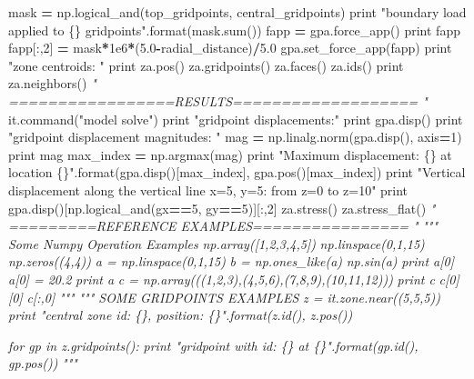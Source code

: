 \documentclass[a4paper, nobind]{templates/ociamthesis}
\newenvironment{Shaded}{\begin{snugshade}}{\end{snugshade}}
\newcommand{\BuiltInTok}[1]{#1}
\newcommand{\CommentTok}[1]{\textcolor[rgb]{0.56,0.35,0.01}{\textit{#1}}}
\newcommand{\DecValTok}[1]{\textcolor[rgb]{0.00,0.00,0.81}{#1}}
\newcommand{\FloatTok}[1]{\textcolor[rgb]{0.00,0.00,0.81}{#1}}
\newcommand{\NormalTok}[1]{#1}
\newcommand{\OperatorTok}[1]{\textcolor[rgb]{0.81,0.36,0.00}{\textbf{#1}}}
\newcommand{\SpecialCharTok}[1]{\textcolor[rgb]{0.00,0.00,0.00}{#1}}
\newcommand{\StringTok}[1]{\textcolor[rgb]{0.31,0.60,0.02}{#1}}
\renewenvironment{Shaded}
{
  \vspace{10pt}%
  \begin{snugshade}%
}{%
  \end{snugshade}%
  \vspace{8pt}%
}
\begin{document}
\begin{Shaded}
\begin{Highlighting}[]
\NormalTok{mask }\OperatorTok{=}\NormalTok{ np.logical\_and(top\_gridpoints, central\_gridpoints)}
\BuiltInTok{print} \StringTok{"boundary load applied to }\SpecialCharTok{\{\}}\StringTok{ gridpoints"}\NormalTok{.}\BuiltInTok{format}\NormalTok{(mask.}\BuiltInTok{sum}\NormalTok{())}
\NormalTok{fapp }\OperatorTok{=}\NormalTok{ gpa.force\_app()}
\BuiltInTok{print}\NormalTok{ fapp}
\NormalTok{fapp[:,}\DecValTok{2}\NormalTok{] }\OperatorTok{=}\NormalTok{ mask}\OperatorTok{*}\FloatTok{1e6}\OperatorTok{*}\NormalTok{(}\FloatTok{5.0}\OperatorTok{{-}}\NormalTok{radial\_distance)}\OperatorTok{/}\FloatTok{5.0}
\NormalTok{gpa.set\_force\_app(fapp)}
\BuiltInTok{print} \StringTok{"zone centroids: "}
\BuiltInTok{print}\NormalTok{ za.pos()}
\NormalTok{za.gridpoints()}
\NormalTok{za.faces()}
\NormalTok{za.ids()}
\BuiltInTok{print}\NormalTok{ za.neighbors()}
\CommentTok{" =================RESULTS=================== "}
\NormalTok{it.command(}\StringTok{"model solve"}\NormalTok{)}
\BuiltInTok{print} \StringTok{"gridpoint displacements:"}
\BuiltInTok{print}\NormalTok{ gpa.disp()}
\BuiltInTok{print} \StringTok{"gridpoint displacement magnitudes: "}
\NormalTok{mag }\OperatorTok{=}\NormalTok{ np.linalg.norm(gpa.disp(), axis}\OperatorTok{=}\DecValTok{1}\NormalTok{)}
\BuiltInTok{print}\NormalTok{ mag}
\NormalTok{max\_index }\OperatorTok{=}\NormalTok{ np.argmax(mag)}
\BuiltInTok{print} \StringTok{"Maximum displacement: }\SpecialCharTok{\{\}}\StringTok{ at location }\SpecialCharTok{\{\}}\StringTok{"}\NormalTok{.}\BuiltInTok{format}\NormalTok{(gpa.disp()[max\_index],}
\NormalTok{                                              gpa.pos()[max\_index])}
\BuiltInTok{print} \StringTok{"Vertical displacement along the vertical line x=5, y=5: from z=0 to z=10"}
\BuiltInTok{print}\NormalTok{ gpa.disp()[np.logical\_and(gx}\OperatorTok{==}\DecValTok{5}\NormalTok{, gy}\OperatorTok{==}\DecValTok{5}\NormalTok{)][:,}\DecValTok{2}\NormalTok{]}
\NormalTok{za.stress()}
\NormalTok{za.stress\_flat()}
\CommentTok{" =========REFERENCE EXAMPLES================ "}
\CommentTok{""" Some Numpy Operation Examples}
\CommentTok{np.array([1,2,3,4,5])}
\CommentTok{np.linspace(0,1,15)}
\CommentTok{np.zeros((4,4))}
\CommentTok{a = np.linspace(0,1,15)}
\CommentTok{b = np.ones\_like(a)}
\CommentTok{np.sin(a)}
\CommentTok{print a[0]}
\CommentTok{a[0] = 20.2}
\CommentTok{print a}
\CommentTok{c = np.array(((1,2,3),(4,5,6),(7,8,9),(10,11,12)))}
\CommentTok{print c}
\CommentTok{c[0][0]}
\CommentTok{c[:,0]}
\CommentTok{"""}
\CommentTok{""" SOME GRIDPOINTS EXAMPLES}
\CommentTok{z = it.zone.near((5,5,5))}
\CommentTok{print "central zone id: \{\}, position: \{\}".format(z.id(), z.pos())}

\CommentTok{for gp in z.gridpoints():}
\CommentTok{    print "gridpoint with id: \{\} at \{\}".format(gp.id(), gp.pos())}
\CommentTok{"""}
\end{Highlighting}
\end{Shaded}
\end{document}
